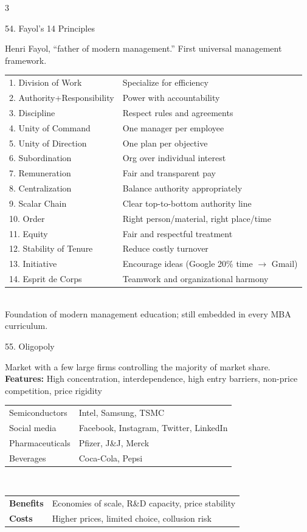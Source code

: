 \documentclass[7.5pt, letterpaper]{article}
\newcommand{\concept}[1]{%
  \vspace{2.5pt}%
  \noindent\colorbox{accent}{\parbox{\dimexpr\linewidth-2\fboxsep}{\fontsize{6.8pt}{7.5pt}\selectfont\bfseries\color{white}\strut #1\strut}}%
  \vspace{1pt}\par%
}
\newcommand{\kv}[2]{\noindent\textbf{#1:} #2\par}
\newcommand{\minitab}[1]{%
  \begingroup
  \fontsize{6.2pt}{7pt}\selectfont
  \setlength{\tabcolsep}{2pt}
  #1
  \endgroup
}
\begin{document}
\begin{multicols}{3}
\concept{54. Fayol's 14 Principles}
Henri Fayol, ``father of modern management.'' First universal management framework.\\
\minitab{\begin{tabular}{@{}ll@{}}
1. Division of Work & Specialize for efficiency\\
2. Authority+Responsibility & Power with accountability\\
3. Discipline & Respect rules and agreements\\
4. Unity of Command & One manager per employee\\
5. Unity of Direction & One plan per objective\\
6. Subordination & Org over individual interest\\
7. Remuneration & Fair and transparent pay\\
8. Centralization & Balance authority appropriately\\
9. Scalar Chain & Clear top-to-bottom authority line\\
10. Order & Right person/material, right place/time\\
11. Equity & Fair and respectful treatment\\
12. Stability of Tenure & Reduce costly turnover\\
13. Initiative & Encourage ideas (Google 20\% time $\to$ Gmail)\\
14. Esprit de Corps & Teamwork and organizational harmony\\
\end{tabular}}\\
Foundation of modern management education; still embedded in every MBA curriculum.

\concept{55. Oligopoly}
Market with a few large firms controlling the majority of market share.\\
\kv{Features}{High concentration, interdependence, high entry barriers, non-price competition, price rigidity}
\minitab{\begin{tabular}{@{}ll@{}}
Semiconductors & Intel, Samsung, TSMC\\
Social media & Facebook, Instagram, Twitter, LinkedIn\\
Pharmaceuticals & Pfizer, J\&J, Merck\\
Beverages & Coca-Cola, Pepsi\\
\end{tabular}}\\
\minitab{\begin{tabular}{@{}ll@{}}
\textbf{Benefits} & Economies of scale, R\&D capacity, price stability\\
\textbf{Costs} & Higher prices, limited choice, collusion risk\\
\end{tabular}}


\end{multicols}
\end{document}
